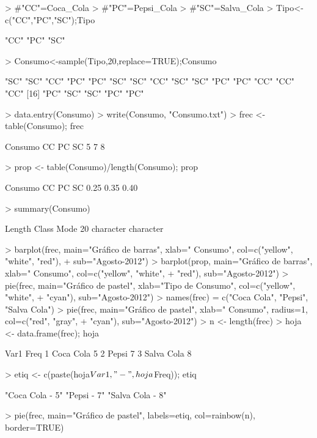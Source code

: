 \documentclass{article}
\begin{document}
\begin{Schunk}
\begin{Sinput}
> #"CC"=Coca_Cola
> #"PC"=Pepsi_Cola
> #"SC"=Salva_Cola
> Tipo<-c("CC","PC","SC");Tipo
\end{Sinput}
\begin{Soutput}
[1] "CC" "PC" "SC"
\end{Soutput}
\begin{Sinput}
> Consumo<-sample(Tipo,20,replace=TRUE);Consumo
\end{Sinput}
\begin{Soutput}
 [1] "SC" "SC" "CC" "PC" "PC" "SC" "SC" "CC" "SC" "SC" "PC" "PC" "CC" "CC" "CC"
[16] "PC" "SC" "SC" "PC" "PC"
\end{Soutput}
\begin{Sinput}
> data.entry(Consumo)
> write(Consumo, "Consumo.txt")
> frec <- table(Consumo); frec
\end{Sinput}
\begin{Soutput}
Consumo
CC PC SC 
 5  7  8 
\end{Soutput}
\begin{Sinput}
> prop <- table(Consumo)/length(Consumo); prop
\end{Sinput}
\begin{Soutput}
Consumo
  CC   PC   SC 
0.25 0.35 0.40 
\end{Soutput}
\begin{Sinput}
> summary(Consumo)
\end{Sinput}
\begin{Soutput}
   Length     Class      Mode 
       20 character character 
\end{Soutput}
\begin{Sinput}
> barplot(frec, main="Gráfico de barras", xlab=" Consumo", col=c("yellow", "white", "red"),
+ sub="Agosto-2012")
> barplot(prop, main="Gráfico de barras", xlab=" Consumo\n", col=c("yellow", "white",
+ "red"), sub="Agosto-2012")
> pie(frec, main="Gráfico de pastel", xlab="Tipo de Consumo", col=c("yellow", "white",
+ "cyan"), sub="Agosto-2012")
> names(frec) = c("Coca Cola", "Pepsi", "Salva Cola")
> pie(frec, main="Gráfico de pastel", xlab=" Consumo", radius=1, col=c("red", "gray",
+ "cyan"), sub="Agosto-2012")
> n <- length(frec)
> hoja <- data.frame(frec); hoja
\end{Sinput}
\begin{Soutput}
        Var1 Freq
1  Coca Cola    5
2      Pepsi    7
3 Salva Cola    8
\end{Soutput}
\begin{Sinput}
> etiq <- c(paste(hoja$Var1, "-", hoja$Freq)); etiq
\end{Sinput}
\begin{Soutput}
[1] "Coca Cola - 5"  "Pepsi - 7"      "Salva Cola - 8"
\end{Soutput}
\begin{Sinput}
> pie(frec, main="Gráfico de pastel", labels=etiq, col=rainbow(n), border=TRUE)
\end{Sinput}
\end{Schunk}
\end{document}

